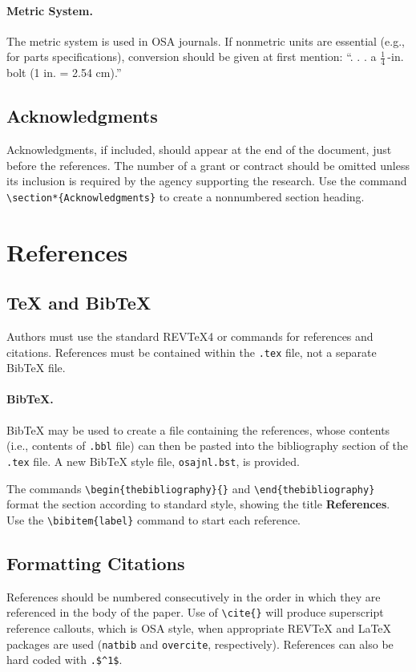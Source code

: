 \documentclass[letterpaper,12pt]{article}   %
\begin{document}
\paragraph*{\bf Metric System.}
The metric system is used in OSA journals. If nonmetric units are
essential (e.g., for parts specifications), conversion should be
given at first mention:  ``. . . a $\frac{1}{4}$\,-in. bolt (1 in.
= 2.54 cm).''


\subsection{Acknowledgments} Acknowledgments, if included, should
appear at the end of the document, just before the references. The
number of a grant or contract should be omitted unless its
inclusion is required by the agency supporting the research. Use
the command \verb+\section*{Acknowledgments}+  to create a
nonnumbered section heading.

\section{References}
\subsection{\TeX{} and Bib\TeX} Authors must use the standard
REV\TeX{}4 or \LaTeXe{} commands for references and citations.
References must be contained within the \texttt{.tex} file, not a
separate Bib\TeX{} file.  

\paragraph{Bib\TeX.} Bib\TeX{} may be used to create a file
containing the references, whose contents (i.e., contents of \texttt{.bbl} file) can then be pasted into the bibliography section of
the \texttt{.tex} file. A new Bib\TeX{} style file, \texttt{osajnl.bst}, is provided.

The commands \verb+\begin{thebibliography}{}+ and
\verb+\end{thebibliography}+ format the section according to
standard style, showing the title {\bf References}.  Use the
\verb+\bibitem{label}+ command to start each reference.

\subsection{Formatting Citations}
References should be numbered consecutively in the order in which
they are referenced in the body of the paper. Use of
\verb+\cite{}+ will produce superscript reference callouts, which
is OSA style, when appropriate REV\TeX{} and \LaTeX{} packages are
used (\texttt{natbib} and \texttt{overcite}, respectively). References
can also be hard coded with \verb+.$^1$+.
\end{document}
